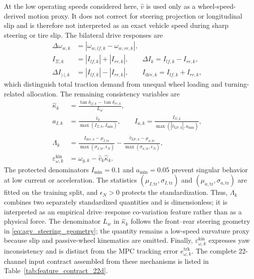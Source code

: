 \documentclass{ieeeaccess}
\begin{document}
At the low operating speeds considered here, $\hat v$ is used only as a wheel-speed-derived motion proxy. It does not correct for steering projection or longitudinal slip and is therefore not interpreted as an exact vehicle speed during sharp steering or tire slip. The bilateral drive responses are
\begin{align}
\Delta\omega_{w,k}&=\left|\omega_{w,lf,k}-\omega_{w,rr,k}\right|,\nonumber\\
I_{\Sigma,k}&=|I_{lf,k}|+|I_{rr,k}|,\qquad
\Delta I_k=I_{lf,k}-I_{rr,k},\nonumber\\
\Delta I_{|\cdot|,k}&=|I_{lf,k}|-|I_{rr,k}|,\qquad
I_{\mathrm{drv},k}=I_{lf,k}+I_{rr,k},
\label{eq:drive_asymmetry_channels}
\end{align}
which distinguish total traction demand from unequal wheel loading and turning-related allocation. The remaining consistency variables are
\begin{align}
\hat\kappa_k&=\frac{\tan\delta_{lf,k}-\tan\delta_{rr,k}}{L_w},\nonumber\\
a_{I,k}&=\frac{\dot{\hat v}_k}{\max(I_{\Sigma,k},I_{\min})},\qquad
I_{a,k}=\frac{I_{\Sigma,k}}
{\max(|\dot{\hat v}_{\mathrm{LP},k}|,a_{\min})},\nonumber\\
\Lambda_k&=
\frac{I_{\mathrm{drv},k}-\mu_{I,\mathrm{tr}}}{\max(\sigma_{I,\mathrm{tr}},\epsilon_N)}
-\frac{\dot{\hat v}_{\mathrm{LP},k}-\mu_{a,\mathrm{tr}}}{\max(\sigma_{a,\mathrm{tr}},\epsilon_N)},\nonumber\\
\varepsilon_{\omega,k}^{\mathrm{kin}}&=\omega_{g,k}-\hat v_k\hat\kappa_k .
\label{eq:load_consistency_channels}
\end{align}
The protected denominators $I_{\min}=0.1$ and $a_{\min}=0.05$ prevent singular behavior at low current or acceleration. The statistics $(\mu_{I,\mathrm{tr}},\sigma_{I,\mathrm{tr}})$ and $(\mu_{a,\mathrm{tr}},\sigma_{a,\mathrm{tr}})$ are fitted on the training split, and $\epsilon_N>0$ protects the standardization. Thus, $\Lambda_k$ combines two separately standardized quantities and is dimensionless; it is interpreted as an empirical drive--response co-variation feature rather than as a physical force. The denominator $L_w$ in $\hat\kappa_k$ follows the front--rear steering geometry in \eqref{eq:agv_steering_geometry}; the quantity remains a low-speed curvature proxy because slip and passive-wheel kinematics are omitted. Finally, $\varepsilon_{\omega,k}^{\mathrm{kin}}$ expresses yaw inconsistency and is distinct from the MPC tracking error $e_{\omega,k}^{\mathrm{trk}}$. The complete 22-channel input contract assembled from these mechanisms is listed in Table~\ref{tab:feature_contract_22d}.
\end{document}
